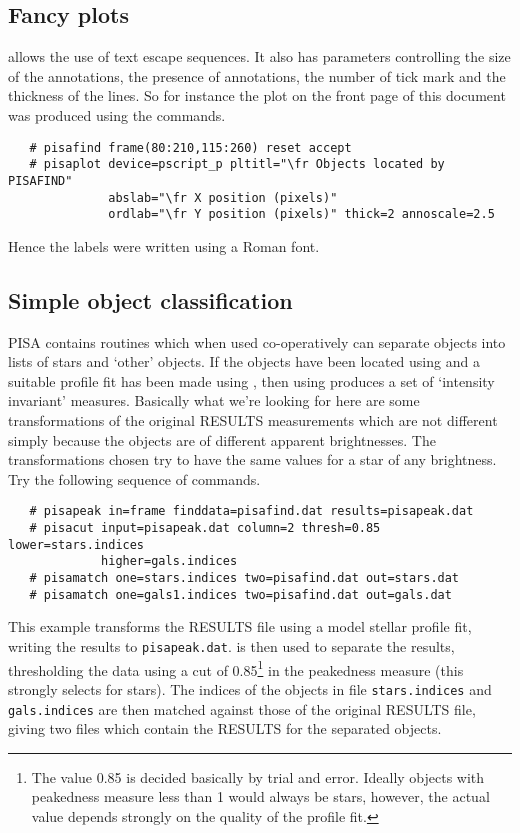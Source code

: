\subsection{Fancy plots}

 allows the use of  text escape
sequences.
It also has parameters controlling the size of the annotations, the
presence of annotations, the number of tick mark and the thickness of
the lines. So for instance the plot on the front page of this document
was produced using the commands.
\begin{verbatim}
   # pisafind frame(80:210,115:260) reset accept
   # pisaplot device=pscript_p pltitl="\fr Objects located by PISAFIND"
              abslab="\fr X position (pixels)"
              ordlab="\fr Y position (pixels)" thick=2 annoscale=2.5
\end{verbatim}

Hence the labels were written using a Roman font.

\subsection{Simple object classification}

PISA contains routines which when used co-operatively can separate
objects into lists of stars and `other' objects. If the objects have
been located using  and a suitable profile fit has been
made using , then using  produces a set
of `intensity invariant' measures. Basically what we're looking for
here are some transformations of the original  RESULTS
measurements which are not different simply because the objects are of
different apparent brightnesses. The transformations chosen try to
have the same values for a star of any brightness. Try the following
sequence of commands.

\begin{verbatim}
   # pisapeak in=frame finddata=pisafind.dat results=pisapeak.dat
   # pisacut input=pisapeak.dat column=2 thresh=0.85 lower=stars.indices
             higher=gals.indices
   # pisamatch one=stars.indices two=pisafind.dat out=stars.dat
   # pisamatch one=gals1.indices two=pisafind.dat out=gals.dat
\end{verbatim}

This example transforms the  RESULTS file using a model
stellar profile fit, writing the results to
\verb+pisapeak.dat+.  is then used to separate the
 results, thresholding the data using a cut of
0.85\footnote{The value 0.85 is decided basically by trial and
error. Ideally objects with peakedness measure less than 1 would
always be stars, however, the actual value depends strongly on the
quality of the profile fit.}  in the peakedness measure (this strongly
selects for stars). The indices of the objects in file
\verb+stars.indices+ and \verb+gals.indices+ are then matched against
those of the original  RESULTS file, giving two files
which contain the  RESULTS for the separated objects.

